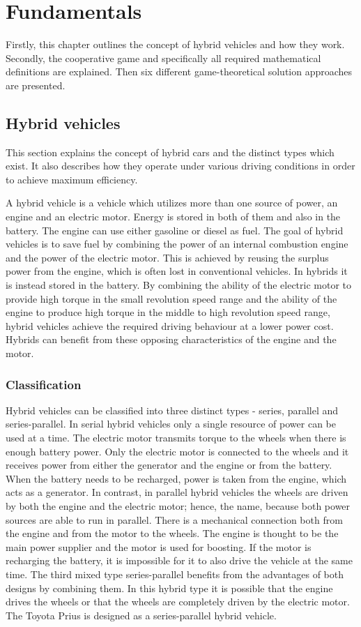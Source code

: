 \chapter{Fundamentals}
\label{chp:fundamentals}
Firstly, this chapter outlines the concept of hybrid vehicles and how they work. Secondly, the cooperative game and specifically all required mathematical definitions are explained. Then six different game-theoretical solution approaches are presented.

\section{Hybrid vehicles}
This section explains the concept of hybrid cars and the distinct types which exist. It also describes how they operate under various driving conditions in order to achieve maximum efficiency.

A hybrid vehicle is a vehicle which utilizes more than one source of power, an engine and an electric motor. Energy is stored in both of them and also in the battery. The engine can use either gasoline or diesel as fuel. The goal of hybrid vehicles is to save fuel by combining the power of an internal combustion engine and the power of the electric motor. This is achieved by reusing the surplus power from the engine, which is often lost in conventional vehicles. In hybrids it is instead stored in the battery. By combining the ability of the electric motor to provide high torque in the small revolution speed range and the ability of the engine to produce high torque in the middle to high revolution speed range, hybrid vehicles achieve the required driving behaviour at a lower power cost. Hybrids can benefit from these opposing characteristics of the engine and the motor.

\subsection{Classification}
Hybrid vehicles can be classified into three distinct types - series, parallel and series-parallel. In serial hybrid vehicles only a single resource of power can be used at a time. The electric motor transmits torque to the wheels when there is enough battery power. Only the electric motor is connected to the wheels and it receives power from either the generator and the engine or from the battery. When the battery needs to be recharged, power is taken from the engine, which acts as a generator. In contrast, in parallel hybrid vehicles the wheels are driven by both the engine and the electric motor; hence, the name, because both power sources are able to run in parallel. There is a mechanical connection both from the engine and from the motor to the wheels. The engine is thought to be the main power supplier and the motor is used for boosting. If the motor is recharging the battery, it is impossible for it to also drive the vehicle at the same time. The third mixed type series-parallel benefits from the advantages of both designs by combining them. In this hybrid type it is possible that the engine drives the wheels or that the wheels are completely driven by the electric motor. The Toyota Prius is designed as a series-parallel hybrid vehicle.

